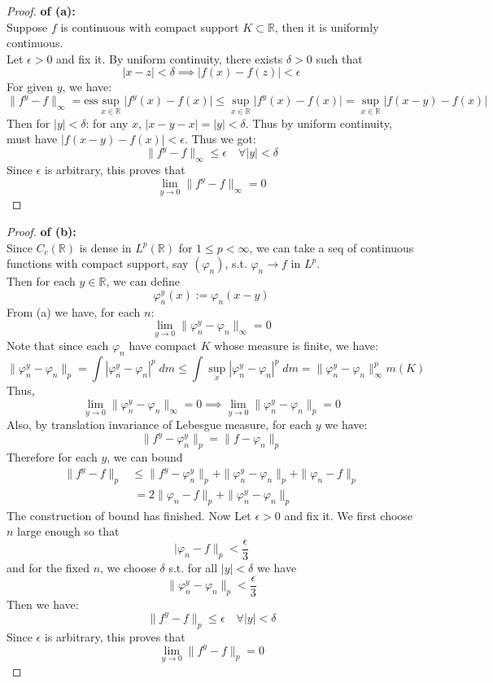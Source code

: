 \documentclass[lang=cn,11pt]{elegantbook}
\begin{document}
\begin{proof}
    \textbf{of (a): } \\
   Suppose \(f\) is continuous with compact support \(K\subset \mathbb{R}\), then it is uniformly continuous. \\
Let $\epsilon > 0$ and fix it. By uniform continuity, there exists \(\delta > 0\) such that \[\bigl|x - z\bigr| < \delta \implies |f(x) - f(z)| < \epsilon\]
For given $y$, we have: \[
     \|f^y - f\|_\infty = \text{ess} \sup_{x\in \mathbb{R}} \bigl|f^y(x) - f(x)\bigr| \leq
     \sup_{x \in \mathbb{R}} \bigl|f^y(x) - f(x)\bigr| = 
     \sup_{x \in \mathbb{R}} \bigl|f(x - y) - f(x)\bigr|
   \]
   Then for \(\lvert y \rvert < \delta\): for any \(x\), \(\lvert x-y - x\rvert = |y| < \delta\). Thus by uniform continuity, must have
   \(\bigl|f(x-y) - f(x)\bigr| < \epsilon\). Thus we got: \[
     \|f^y - f\|_\infty \le  \epsilon
     \quad \forall |y| < \delta
   \]
Since \(\epsilon\) is arbitrary, this proves that
\[
  \lim_{y \to 0} \|f^y - f\|_\infty = 0
\]
\end{proof}

\begin{proof}
    \textbf{of (b):}\\
Since \(C_c(\mathbb{R})\) is dense in \(L^p(\mathbb{R})\) for \(1 \le p < \infty\), we can take a seq of continuous functions with compact support, say \((\varphi_n)\), s.t. \(\varphi_n \to f\) in \(L^p\).\\
Then for each $y\in \mathbb{R}$, we can define \[\varphi_n^y(x) := \varphi_n(x - y)\]
From (a) we have, for each $n$: \[
 \lim_{y \to 0} \|\varphi_n^y - \varphi_n\|_\infty = 0
\]
Note that since each $\varphi_n$ have compact $K$ whose measure is finite, we have: \[
  \|\varphi_n^y - \varphi_n\|_p = \int |\varphi_n^y - \varphi_n |^p \; dm \leq \int \sup_x|\varphi_n^y - \varphi_n|^p \; dm = \|\varphi_n^y - \varphi_n\|_\infty^p   m(K)
  \]
Thus, \[
    \lim_{y \to 0} \|\varphi_n^y - \varphi_n\|_\infty = 0 \implies  \lim_{y \to 0} \|\varphi_n^y - \varphi_n\|_p = 0
   \]
Also, by translation invariance of Lebesgue measure, for each $y$ we have: \[
\|f^y - \varphi_n^y\|_p  =  \|f - \varphi_n\|_p
\]
Therefore for each \(y\), we can bound 
\begin{align*}
      \|f^y - f\|_p &\leq 
       \|f^y - \varphi_n^y\|_p + 
       \|\varphi_n^y - \varphi_n\|_p + 
       \|\varphi_n - f\|_p \\
       &\ = 2 \|\varphi_n - f\|_p + \|\varphi_n^y - \varphi_n\|_p
\end{align*}
The construction of bound has finished. Now Let $\epsilon > 0$ and fix it. We first choose \(n\) large enough so that \[|\varphi_n - f\|_p < \frac{\epsilon}{3}\]
and for the fixed \(n\), we choose $\delta$ s.t. for all $|y| < \delta$ we have \[\| \varphi_n^y - \varphi_n\|_p < \frac{\epsilon}{3}\]
Then we have: \[
  \|f^y - f\|_p  \leq  \epsilon \quad \forall  |y| < \delta
\]
Since $\epsilon$ is arbitrary, this proves that \[
  \lim_{y \to 0} \|f^y - f\|_p = 0
\]
\end{proof}
\end{document}
